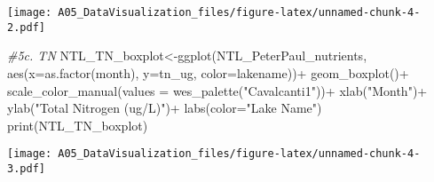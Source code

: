 \documentclass[
]{article}
\newenvironment{Shaded}{\begin{snugshade}}{\end{snugshade}}
\newcommand{\AttributeTok}[1]{\textcolor[rgb]{0.77,0.63,0.00}{#1}}
\newcommand{\CommentTok}[1]{\textcolor[rgb]{0.56,0.35,0.01}{\textit{#1}}}
\newcommand{\FunctionTok}[1]{\textcolor[rgb]{0.00,0.00,0.00}{#1}}
\newcommand{\NormalTok}[1]{#1}
\newcommand{\OtherTok}[1]{\textcolor[rgb]{0.56,0.35,0.01}{#1}}
\newcommand{\SpecialCharTok}[1]{\textcolor[rgb]{0.00,0.00,0.00}{#1}}
\newcommand{\StringTok}[1]{\textcolor[rgb]{0.31,0.60,0.02}{#1}}
\begin{document}
\texttt{[image: A05\_DataVisualization\_files/figure-latex/unnamed-chunk-4-2.pdf]}

\begin{Shaded}
\begin{Highlighting}[]
\CommentTok{\#5c. TN}
\NormalTok{NTL\_TN\_boxplot}\OtherTok{\textless{}{-}}\FunctionTok{ggplot}\NormalTok{(NTL\_PeterPaul\_nutrients,}
                       \FunctionTok{aes}\NormalTok{(}\AttributeTok{x=}\FunctionTok{as.factor}\NormalTok{(month), }\AttributeTok{y=}\NormalTok{tn\_ug, }\AttributeTok{color=}\NormalTok{lakename))}\SpecialCharTok{+}
                       \FunctionTok{geom\_boxplot}\NormalTok{()}\SpecialCharTok{+}
                       \FunctionTok{scale\_color\_manual}\NormalTok{(}\AttributeTok{values =} \FunctionTok{wes\_palette}\NormalTok{(}\StringTok{"Cavalcanti1"}\NormalTok{))}\SpecialCharTok{+}
                       \FunctionTok{xlab}\NormalTok{(}\StringTok{"Month"}\NormalTok{)}\SpecialCharTok{+}
                       \FunctionTok{ylab}\NormalTok{(}\StringTok{"Total Nitrogen (ug/L)"}\NormalTok{)}\SpecialCharTok{+}
                       \FunctionTok{labs}\NormalTok{(}\AttributeTok{color=}\StringTok{"Lake Name"}\NormalTok{)}
\FunctionTok{print}\NormalTok{(NTL\_TN\_boxplot)}
\end{Highlighting}
\end{Shaded}

\texttt{[image: A05\_DataVisualization\_files/figure-latex/unnamed-chunk-4-3.pdf]}
\end{document}
